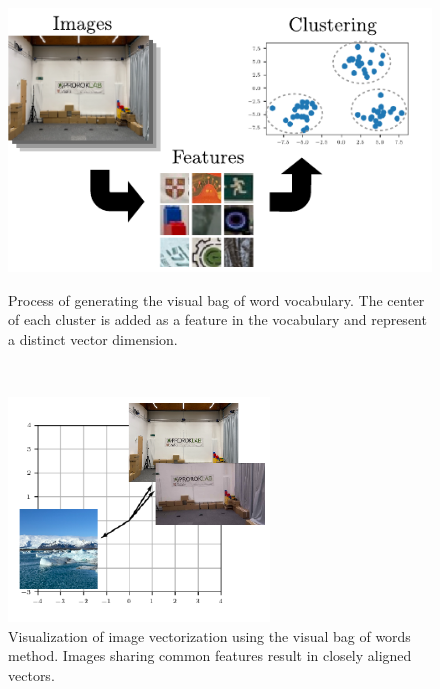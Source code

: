 \begin{figure}[h]
    \captionsetup{format=plain}
    \begin{minipage}[t]{0.55\linewidth}
        \centering
        \includegraphics[width=\linewidth]{figures/bow_vocab.pdf}

        \caption{Process of generating the visual bag of word vocabulary. The center of each cluster is added as a feature in the vocabulary and represent a distinct vector dimension.}
        \label{fig:bow-vocab}
    \end{minipage}\hfill%
    ~
    \begin{minipage}[t]{0.4\linewidth}
        \centering
        \includegraphics[width=\linewidth]{figures/bow.pdf}
        \caption{Visualization of image vectorization using the visual bag of words method. Images sharing common features result in closely aligned vectors.}
        \label{fig:bow-vector}
    \end{minipage}
\end{figure}

